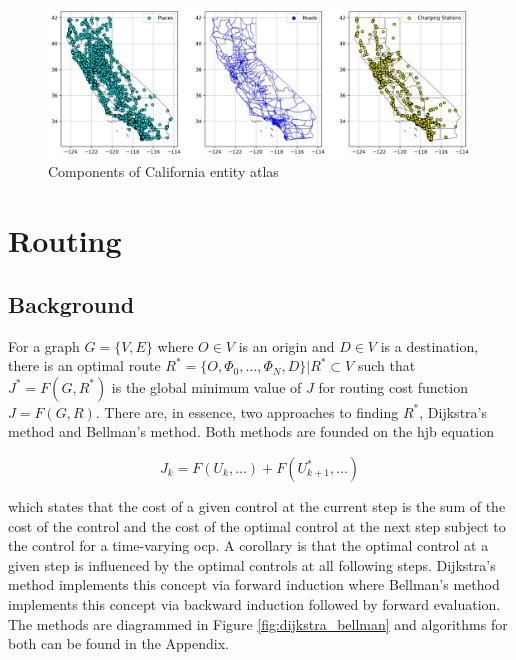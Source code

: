 \documentclass[12pt]{article}
\begin{document}
\begin{figure}[H]
	\centering
	\includegraphics[width = \linewidth]{figs/California_Places_Chargers.png}
	\caption{Components of California entity atlas}
	\label{fig:california_entity_atlas}
\end{figure}

\section*{Routing}

\subsection*{Background}

For a graph $G=\{V,E\}$ where $O\in V$ is an origin and $D\in V$ is a destination, there is an optimal route $R^* = \{O, \Phi_0, \dots, \Phi_N, D\}| R^*\subset V$ such that $J^*=F(G,R^*)$ is the global minimum value of $J$ for routing cost function $J = F(G,R)$. There are, in essence, two approaches to finding $R^*$, Dijkstra's method and Bellman's method. Both methods are founded on the \gls{hjb} equation

\begin{equation}
	J_k = F(U_k,\dots) + F(U^*_{k+1},\dots)
\end{equation}

which states that the cost of a given control at the current step is the sum of the cost of the control and the cost of the optimal control at the next step subject to the control for a time-varying \gls{ocp}. A corollary is that the optimal control at a given step is influenced by the optimal controls at all following steps. Dijkstra's method implements this concept via forward induction where Bellman's method implements this concept via backward induction followed by forward evaluation. The methods are diagrammed in Figure \ref{fig:dijkstra_bellman} and algorithms for both can be found in the Appendix.
\end{document}
